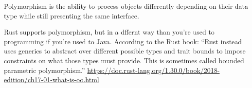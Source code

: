 Polymorphism is the ability to process objects differently depending on their
data type while still presenting the same interface.

Rust supports polymorphism, but in a dffernt way than you're used to
programming if you're used to Java. According to the Rust book:
``Rust instead uses generics to abstract over different possible types and trait
bounds to impose constraints on what those types must provide. This is
sometimes called bounded parametric polymorphism.''
\url{https://doc.rust-lang.org/1.30.0/book/2018-edition/ch17-01-what-is-oo.html}




